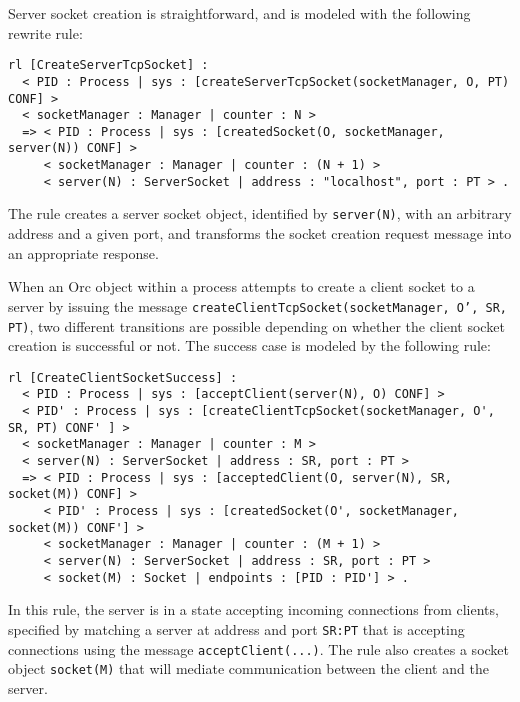 \documentclass{eptcs}
\begin{document}
Server socket creation is straightforward, and is modeled with the following rewrite rule:

\begin{small}
\begin{verbatim}
rl [CreateServerTcpSocket] : 
  < PID : Process | sys : [createServerTcpSocket(socketManager, O, PT) CONF] >
  < socketManager : Manager | counter : N >
  => < PID : Process | sys : [createdSocket(O, socketManager, server(N)) CONF] >
     < socketManager : Manager | counter : (N + 1) >
     < server(N) : ServerSocket | address : "localhost", port : PT > .
\end{verbatim}
\end{small}

\noindent The rule creates a server socket object, identified by \texttt{server(N)}, with an arbitrary address and a given port, and transforms the socket creation request message into an appropriate response. 

When an Orc object within a process attempts to create a client socket to a server by issuing the message \texttt{createClientTcpSocket(socketManager, O', SR, PT)}, two different transitions are possible depending on whether the client socket creation is successful or not. The success case is modeled by the following rule:

\begin{small}
\begin{verbatim}
rl [CreateClientSocketSuccess] : 
  < PID : Process | sys : [acceptClient(server(N), O) CONF] >
  < PID' : Process | sys : [createClientTcpSocket(socketManager, O', SR, PT) CONF' ] >
  < socketManager : Manager | counter : M >
  < server(N) : ServerSocket | address : SR, port : PT > 
  => < PID : Process | sys : [acceptedClient(O, server(N), SR, socket(M)) CONF] >
     < PID' : Process | sys : [createdSocket(O', socketManager, socket(M)) CONF'] >
     < socketManager : Manager | counter : (M + 1) > 
     < server(N) : ServerSocket | address : SR, port : PT >
     < socket(M) : Socket | endpoints : [PID : PID'] > .
\end{verbatim}
\end{small}

\noindent In this rule, the server is in a state accepting incoming connections from clients, specified by matching a server at address and port \texttt{SR:PT} that is accepting connections using the message \texttt{acceptClient(...)}. The rule also creates a socket object \texttt{socket(M)} that will mediate communication between the client and the server. 
\end{document}
